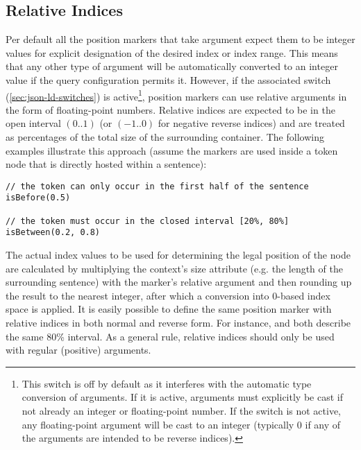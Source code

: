 \documentclass[11pt,a4paper]{report}
\begin{document}
\subsection{Relative Indices}
\label{sec:marker-relative}
Per default all the position markers that take argument expect them to be integer values for explicit designation of the desired index or index range.
This means that any other type of argument will be automatically converted to an integer value if the query configuration permits it.
However, if the associated switch (\ref{sec:json-ld-switches}) is active\footnote{This switch is off by default as it interferes with the automatic type conversion of arguments. If it is active, arguments must explicitly be cast if not already an integer or floating-point number. If the switch is not active, any floating-point argument will be cast to an integer (typically 0 if any of the arguments are intended to be reverse indices).}, position markers can use relative arguments in the form of floating-point numbers.
Relative indices are expected to be in the open interval $(0..1)$ (or $(-1..0)$ for negative reverse indices) and are treated as percentages of the total size of the surrounding container.
The following examples illustrate this approach (assume the markers are used inside a token node that is directly hosted within a sentence):
\begin{Verbatim}[samepage=true]
// the token can only occur in the first half of the sentence
isBefore(0.5)

// the token must occur in the closed interval [20%, 80%]
isBetween(0.2, 0.8)
\end{Verbatim}
The actual index values to be used for determining the legal position of the node are calculated by multiplying the context's size attribute (e.g. the length of the surrounding sentence) with the marker's relative argument and then rounding up the result to the nearest integer, after which a conversion into 0-based index space is applied.
It is easily possible to define the same position marker with relative indices in both normal and reverse form.
For instance,  and  both describe the same 80\% interval.
As a general rule, relative indices should only be used with regular (positive) arguments.
\end{document}
